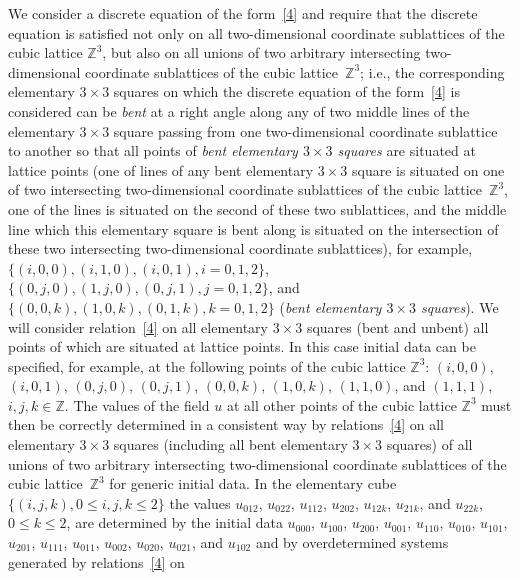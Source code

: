 We consider a discrete equation of the form~\eqref{4} and require
that the discrete equation is sa\-tis\-f\/ied not only on all
two-dimensional coordinate sublattices of the cubic lattice
$\mathbb{Z}^3$, but also on all unions of two arbitrary intersecting
two-dimensional coordinate sublattices of the cubic lattice~$\mathbb{Z}^3$; i.e., the corresponding elementary $3 \times 3$
squares on which the discrete equation of the form~\eqref{4} is
considered can be {\it bent} at a right angle along any of two
middle lines of the elementary $3 \times 3$ square passing from one
two-dimensional coordinate sublattice to another so that all points
of {\it bent elementary $3 \times 3$ squares} are situated at
lattice points (one of lines of any bent elementary $3 \times 3$
square is situated on one of two intersecting two-dimensional
coordinate sublattices of the cubic lattice~$\mathbb{Z}^3$, one of
the lines is situated on the second of these two sublattices, and
the middle line which this elementary square is bent along is
situated on the intersection of these two intersecting
two-dimensional coordinate sublattices), for example, $\{(i, 0, 0),
(i, 1, 0), (i, 0, 1), i = 0, 1, 2\}$, $\{(0, j, 0), (1, j, 0), (0,
j, 1), j = 0, 1, 2\}$, and $\{(0, 0, k), (1, 0, k), (0, 1, k), k =
0, 1, 2\}$ ({\it bent elementary $3 \times 3$ squares}). We will
consider relation~\eqref{4} on all elementary $3 \times 3$ squares
(bent and unbent) all points of which are situated at lattice
points. In this case initial data can be specif\/ied, for example, at
the following points of the cubic lattice $\mathbb{Z}^3$: $(i, 0,
0)$, $(i, 0, 1)$, $(0, j, 0)$, $(0, j, 1)$, $(0, 0, k)$, $(1, 0,
k)$, $(1, 1, 0)$, and $(1, 1, 1)$, $i, j, k \in \mathbb{Z}$. The
values of the f\/ield $u$ at all other points of the cubic lattice
$\mathbb{Z}^3$ must then be correctly determined in a consistent way
by relations~\eqref{4} on all elementary $3 \times 3$ squares
(including all bent elementary $3 \times 3$ squares) of all unions
of two arbitrary intersecting two-dimensional coordinate sublattices
of the cubic lattice~$\mathbb{Z}^3$ for generic initial data. In the
elementary cube $\{(i, j, k), 0 \leq i, j, k \leq 2 \}$ the values
$u_{0 1 2}$, $u_{0 2 2}$, $u_{1 1 2}$, $u_{2 0 2}$, $u_{1 2 k}$,
$u_{2 1 k}$, and $u_{2 2 k}$, $0 \leq k \leq 2$, are determined by
the initial data $u_{0 0 0}$, $u_{1 0 0}$, $u_{2 0 0}$, $u_{0 0 1}$,
$u_{1 1 0}$, $u_{0 1 0}$, $u_{1 0 1}$, $u_{2 0 1}$, $u_{1 1 1}$,
$u_{0 1 1}$, $u_{0 0 2}$, $u_{0 2 0}$, $u_{0 2 1}$, and $u_{1 0 2}$
and by overdetermined systems generated by relations~\eqref{4} on
